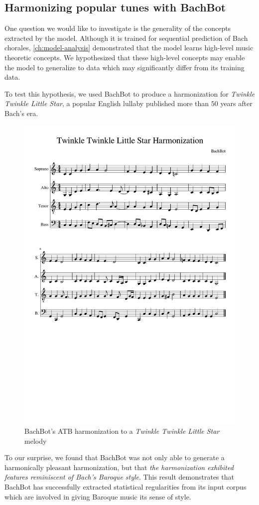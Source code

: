 \subsection{Harmonizing popular tunes with BachBot}

One question we would like to investigate is the generality of the concepts
extracted by the model. Although it is trained for sequential prediction of
Bach chorales, \cref{ch:model-analysis} demonstrated that the model learns
high-level music theoretic concepts. We hypothesized that these high-level
concepts may enable the model to generalize to data which may significantly
differ from its training data.

To test this hypothesis, we used BachBot to produce a harmonization for
\textit{Twinkle Twinkle Little Star}, a popular English lullaby published
more than $50$ years after Bach's era.

\begin{figure}[tb]
  \centering
  \includegraphics[trim={0 10cm 0 3.7cm},clip,width=0.9\linewidth]{twinkle-twinkle-score.pdf}
  \caption{BachBot's ATB harmonization to a \textit{Twinkle Twinkle Little Star} melody}
  \label{fig:harm-twinkle-twinkle}
\end{figure}

To our surprise, we found that BachBot was not only able to generate a
harmonically pleasant harmonization, but that \emph{the harmonization exhibited
features reminiscent of Bach's Baroque style}. This result demonstrates that
BachBot has successfully extracted statistical regularities from its input
corpus which are involved in giving Baroque music its sense of style.
